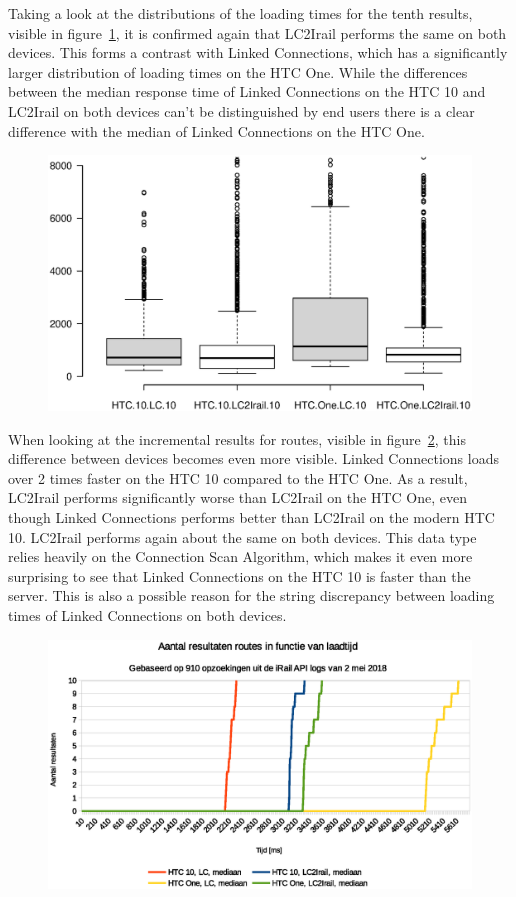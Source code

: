 \documentclass[twocolumn]{phdsymp} %
\begin{document}
Taking a look at the distributions of the loading times for the tenth results, visible in figure~\ref{fig:liveboardboxplot}, it is confirmed again that LC2Irail performs the same on both devices. This forms a contrast with Linked Connections, which has a significantly larger distribution of loading times on the HTC One. While the differences between the median response time of Linked Connections on the HTC 10 and LC2Irail on both devices can't be distinguished by end users %
there is a clear difference with the median of Linked Connections on the HTC One.

\begin{figure}[ht]
	\begin{center}
		\includegraphics[trim=3cm 4cm 0 0, width=.50\textwidth]{images/boxplot_liveboards_10.eps}
		\caption{\label{fig:liveboardboxplot} }
	\end{center}
\end{figure}

When looking at the incremental results for routes, visible in figure~\ref{fig:route}, this difference between devices becomes even more visible. Linked Connections loads over 2 times faster on the HTC 10 compared to the HTC One. As a result, LC2Irail performs significantly worse than LC2Irail on the HTC One, even though Linked Connections performs better than LC2Irail on the modern HTC 10. LC2Irail performs again about the same on both devices.  This data type relies heavily on the Connection Scan Algorithm, which makes it even more surprising to see that Linked Connections on the HTC 10 is faster than the server. This is also a possible reason for the string discrepancy between loading times of Linked Connections on both devices.

\begin{figure}[ht]
	\begin{center}
		\includegraphics[width=.50\textwidth]{images/dief_routes_gemiddeld.eps}
		\caption{\label{fig:route} }
	\end{center}
\end{figure}
\end{document}
